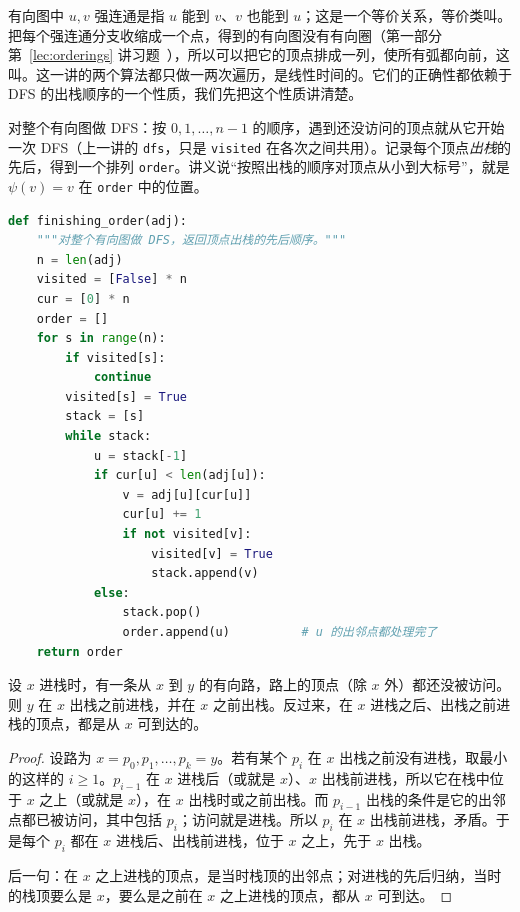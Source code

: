 \label{lec:digraph-orders}

有向图中 $u,v$ 强连通是指 $u$ 能到 $v$、$v$ 也能到 $u$；这是一个等价关系，等价类叫。把每个强连通分支收缩成一个点，得到的有向图没有有向圈（第一部分第~\ref{lec:orderings} 讲习题~），所以可以把它的顶点排成一列，使所有弧都向前，这叫。这一讲的两个算法都只做一两次遍历，是线性时间的。它们的正确性都依赖于 DFS 的出栈顺序的一个性质，我们先把这个性质讲清楚。


对整个有向图做 DFS：按 $0,1,\dots,n-1$ 的顺序，遇到还没访问的顶点就从它开始一次 DFS（上一讲的 \texttt{dfs}，只是 \texttt{visited} 在各次之间共用）。记录每个顶点\emph{出栈}的先后，得到一个排列 \texttt{order}。讲义说“按照出栈的顺序对顶点从小到大标号”，就是 $\psi(v)=v$ 在 \texttt{order} 中的位置。

\begin{lstlisting}[language=Python]
def finishing_order(adj):
    """对整个有向图做 DFS，返回顶点出栈的先后顺序。"""
    n = len(adj)
    visited = [False] * n
    cur = [0] * n
    order = []
    for s in range(n):
        if visited[s]:
            continue
        visited[s] = True
        stack = [s]
        while stack:
            u = stack[-1]
            if cur[u] < len(adj[u]):
                v = adj[u][cur[u]]
                cur[u] += 1
                if not visited[v]:
                    visited[v] = True
                    stack.append(v)
            else:
                stack.pop()
                order.append(u)          # u 的出邻点都处理完了
    return order
\end{lstlisting}

\begin{lemma}[白路引理]\label{lem:digraph-orders:white-path}
设 $x$ 进栈时，有一条从 $x$ 到 $y$ 的有向路，路上的顶点（除 $x$ 外）都还没被访问。则 $y$ 在 $x$ 出栈之前进栈，并在 $x$ 之前出栈。反过来，在 $x$ 进栈之后、出栈之前进栈的顶点，都是从 $x$ 可到达的。
\end{lemma}
\begin{proof}
设路为 $x=p_0,p_1,\dots,p_k=y$。若有某个 $p_i$ 在 $x$ 出栈之前没有进栈，取最小的这样的 $i\geqslant1$。$p_{i-1}$ 在 $x$ 进栈后（或就是 $x$）、$x$ 出栈前进栈，所以它在栈中位于 $x$ 之上（或就是 $x$），在 $x$ 出栈时或之前出栈。而 $p_{i-1}$ 出栈的条件是它的出邻点都已被访问，其中包括 $p_i$；访问就是进栈。所以 $p_i$ 在 $x$ 出栈前进栈，矛盾。于是每个 $p_i$ 都在 $x$ 进栈后、出栈前进栈，位于 $x$ 之上，先于 $x$ 出栈。

后一句：在 $x$ 之上进栈的顶点，是当时栈顶的出邻点；对进栈的先后归纳，当时的栈顶要么是 $x$，要么是之前在 $x$ 之上进栈的顶点，都从 $x$ 可到达。
\end{proof}

